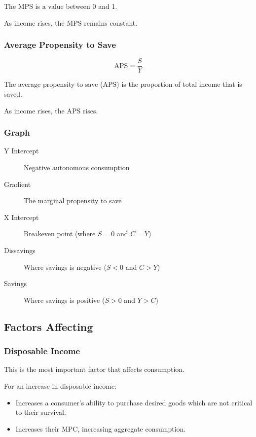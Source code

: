 \documentclass[a4paper,11pt]{article}
\begin{document}
The MPS is a value between 0 and 1.

As income rises, the MPS remains constant.


\subsubsection{Average Propensity to Save}

$$
\mbox{APS} = \frac{S}{Y}
$$

The average propensity to save (APS) is the proportion of total income that is
saved.

As income rises, the APS rises.


\subsubsection{Graph}


\begin{description}
\item [Y Intercept] Negative autonomous consumption
\item [Gradient] The marginal propensity to save
\item [X Intercept] Breakeven point (where $S = 0$ and $C = Y$)
\item [Dissavings] Where savings is negative ($S < 0$ and $C > Y$)
\item [Savings] Where savings is positive ($S > 0$ and $Y > C$)
\end{description}


\subsection{Factors Affecting}

\subsubsection{Disposable Income}

This is the most important factor that affects consumption.

For an increase in disposable income:

\begin{itemize}
\item Increases a consumer's ability to purchase desired goods which are not
	critical to their survival.
\item Increases their MPC, increasing aggregate consumption.
\end{itemize}
\end{document}
